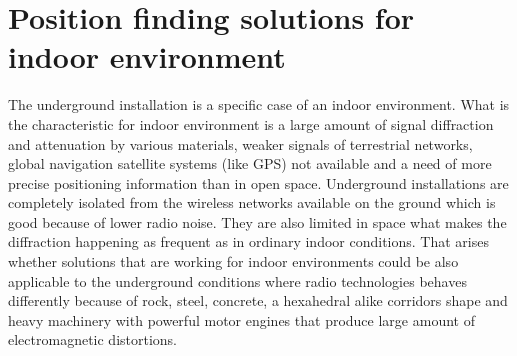 \documentclass[../main.tex]{subfiles}
\begin{document}
\chapter{Position finding solutions for indoor environment}
\label{chapter:position_finding_solution}

The underground installation is a specific case of an indoor environment. What is the characteristic for indoor environment is a large amount of signal diffraction and attenuation by various materials, weaker signals of terrestrial networks, global navigation satellite systems (like GPS) not available and a need of more precise positioning information than in open space. Underground installations are completely isolated from the wireless networks available on the ground which is good because of lower radio noise. They are also limited in space what makes the diffraction happening as frequent as in ordinary indoor conditions. That arises whether solutions that are working for indoor environments could be also applicable to the underground conditions where radio technologies behaves differently because of rock, steel, concrete, a hexahedral\cite{rf_in_mines_straight_gallery}\cite{rf_in_tunnel_waveguide_effect} alike corridors shape and heavy machinery with powerful motor engines that produce large amount of electromagnetic distortions.
\end{document}
